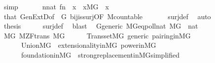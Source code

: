 \begin{isabellebody}
\ simp\isanewline
\ \ \isamarkupfalse%
\isanewline
\ \ \isamarkupfalse%
\ {\isachardoublequoteopen}{\isasymexists}n{\isasymin}nat{\isachardot}{\kern0pt}\ {\isacharquery}{\kern0pt}f{\isacharbackquote}{\kern0pt}n\ {\isacharequal}{\kern0pt}\ x{\isachardoublequoteclose}\ \ {\isachardoublequoteopen}x{\isasymin}M{\isacharbrackleft}{\kern0pt}G{\isacharbrackright}{\kern0pt}{\isachardoublequoteclose}\ \ x\isanewline
\ \ \ \ \isamarkupfalse%
\ that\ GenExtD{\isacharbrackleft}{\kern0pt}of\ {\isacharunderscore}{\kern0pt}\ G{\isacharbrackright}{\kern0pt}\ bij{\isacharunderscore}{\kern0pt}is{\isacharunderscore}{\kern0pt}surj{\isacharbrackleft}{\kern0pt}OF\ M{\isacharunderscore}{\kern0pt}countable{\isacharbrackright}{\kern0pt}\ \isanewline
\ \ \ \ \isamarkupfalse%
\ surj{\isacharunderscore}{\kern0pt}def\ \isamarkupfalse%
\ auto\isanewline
\ \ \isamarkupfalse%
\isanewline
\ \ \isamarkupfalse%
\ {\isacharquery}{\kern0pt}thesis\isanewline
\ \ \ \ \isamarkupfalse%
\ surj{\isacharunderscore}{\kern0pt}def\ \isamarkupfalse%
\ blast\isanewline
{}\isamarkupfalse%
%
\endisatagproof
{\isafoldproof}%
%
\isadelimproof
\isanewline
%
\endisadelimproof
\isanewline
{}\isamarkupfalse%
\ {\isacharparenleft}{\kern0pt}\ G{\isacharunderscore}{\kern0pt}generic{\isacharparenright}{\kern0pt}\ MG{\isacharunderscore}{\kern0pt}eqpoll{\isacharunderscore}{\kern0pt}nat{\isacharcolon}{\kern0pt}\ {\isachardoublequoteopen}M{\isacharbrackleft}{\kern0pt}G{\isacharbrackright}{\kern0pt}\ {\isasymapprox}\ nat{\isachardoublequoteclose}\isanewline
%
\isadelimproof
%
\endisadelimproof
%
\isatagproof
{}\isamarkupfalse%
\ {\isacharminus}{\kern0pt}\isanewline
\ \ \isamarkupfalse%
\ MG{\isacharcolon}{\kern0pt}\ M{\isacharunderscore}{\kern0pt}ZF{\isacharunderscore}{\kern0pt}trans\ {\isachardoublequoteopen}M{\isacharbrackleft}{\kern0pt}G{\isacharbrackright}{\kern0pt}{\isachardoublequoteclose}\isanewline
\ \ \ \ \isamarkupfalse%
\ Transset{\isacharunderscore}{\kern0pt}MG\ generic\ pairing{\isacharunderscore}{\kern0pt}in{\isacharunderscore}{\kern0pt}MG\ \isanewline
\ \ \ \ \ \ Union{\isacharunderscore}{\kern0pt}MG\ \ extensionality{\isacharunderscore}{\kern0pt}in{\isacharunderscore}{\kern0pt}MG\ power{\isacharunderscore}{\kern0pt}in{\isacharunderscore}{\kern0pt}MG\isanewline
\ \ \ \ \ \ foundation{\isacharunderscore}{\kern0pt}in{\isacharunderscore}{\kern0pt}MG\ \ strong{\isacharunderscore}{\kern0pt}replacement{\isacharunderscore}{\kern0pt}in{\isacharunderscore}{\kern0pt}MG{\isacharbrackleft}{\kern0pt}simplified{\isacharbrackright}{\kern0pt}\isanewline

\end{isabellebody}
